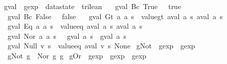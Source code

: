 \begin{isabellebody}
\isanewline
{}\isamarkupfalse%
\ gval\ {\isacharcolon}{\isacharcolon}\ {\isachardoublequoteopen}gexp\ {\isasymRightarrow}\ datastate\ {\isasymRightarrow}\ trilean{\isachardoublequoteclose}\ \isanewline
\ \ {\isachardoublequoteopen}gval\ {\isacharparenleft}Bc\ True{\isacharparenright}\ {\isacharunderscore}\ {\isacharequal}\ true{\isachardoublequoteclose}\ {\isacharbar}\isanewline
\ \ {\isachardoublequoteopen}gval\ {\isacharparenleft}Bc\ False{\isacharparenright}\ {\isacharunderscore}\ {\isacharequal}\ false{\isachardoublequoteclose}\ {\isacharbar}\isanewline
\ \ {\isachardoublequoteopen}gval\ {\isacharparenleft}Gt\ a\ a\ s\ {\isacharequal}\ value{\isacharunderscore}gt\ {\isacharparenleft}aval\ a\ s{\isacharparenright}\ {\isacharparenleft}aval\ a\ s{\isacharparenright}{\isachardoublequoteclose}\ {\isacharbar}\isanewline
\ \ {\isachardoublequoteopen}gval\ {\isacharparenleft}Eq\ a\ a\ s\ {\isacharequal}\ value{\isacharunderscore}eq\ {\isacharparenleft}aval\ a\ s{\isacharparenright}\ {\isacharparenleft}aval\ a\ s{\isacharparenright}{\isachardoublequoteclose}\ {\isacharbar}\isanewline
\ \ {\isachardoublequoteopen}gval\ {\isacharparenleft}Nor\ a\ a\ s\ {\isacharequal}\ {\isasymnot}\isactrlsub {\isacharquery}\ {\isacharparenleft}{\isacharparenleft}gval\ a\ s{\isacharparenright}\ {\isasymor}\isactrlsub {\isacharquery}\ {\isacharparenleft}gval\ a\ s{\isacharparenright}{\isacharparenright}{\isachardoublequoteclose}\ {\isacharbar}\isanewline
\ \ {\isachardoublequoteopen}gval\ {\isacharparenleft}Null\ v{\isacharparenright}\ s\ {\isacharequal}\ value{\isacharunderscore}eq\ {\isacharparenleft}aval\ v\ s{\isacharparenright}\ None{\isachardoublequoteclose}\isanewline
\isanewline
{}\isamarkupfalse%
\ gNot\ {\isacharcolon}{\isacharcolon}\ {\isachardoublequoteopen}gexp\ {\isasymRightarrow}\ gexp{\isachardoublequoteclose}\ \ \isanewline
\ \ {\isachardoublequoteopen}gNot\ g\ {\isasymequiv}\ Nor\ g\ g{\isachardoublequoteclose}\isanewline
\isanewline
{}\isamarkupfalse%
\ gOr\ {\isacharcolon}{\isacharcolon}\ {\isachardoublequoteopen}gexp\ {\isasymRightarrow}\ gexp\ {\isasymRightarrow}\ gexp{\isachardoublequoteclose}\ \ \isanewline

\end{isabellebody}
